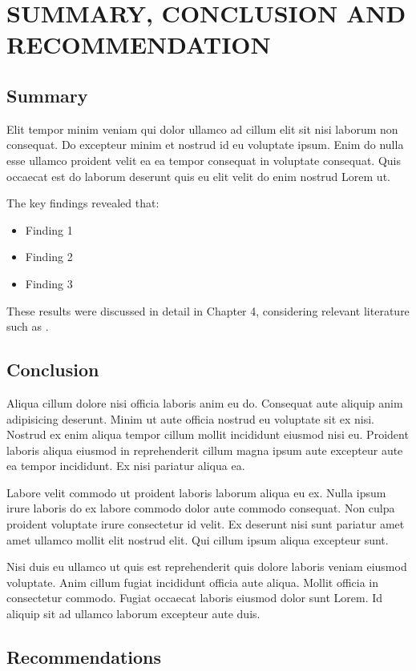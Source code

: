 \chapter{SUMMARY, CONCLUSION AND RECOMMENDATION}

\section{Summary}
Elit tempor minim veniam qui dolor ullamco ad cillum elit sit nisi laborum non consequat. Do excepteur minim et nostrud id eu voluptate ipsum. Enim do nulla esse ullamco proident velit ea ea tempor consequat in voluptate consequat. Quis occaecat est do laborum deserunt quis eu elit velit do enim nostrud Lorem ut.

The key findings revealed that:
\begin{itemize}
  \item Finding 1
  \item Finding 2
  \item Finding 3
\end{itemize}
These results were discussed in detail in Chapter 4, considering relevant literature such as \textcite{placeholderArticle2023}.

\section{Conclusion}
Aliqua cillum dolore nisi officia laboris anim eu do. Consequat aute aliquip anim adipisicing deserunt. Minim ut aute officia nostrud eu voluptate sit ex nisi. Nostrud ex enim aliqua tempor cillum mollit incididunt eiusmod nisi eu. Proident laboris aliqua eiusmod in reprehenderit cillum magna ipsum aute excepteur aute ea tempor incididunt. Ex nisi pariatur aliqua ea.

Labore velit commodo ut proident laboris laborum aliqua eu ex. Nulla ipsum irure laboris do ex labore commodo dolor aute commodo consequat. Non culpa proident voluptate irure consectetur id velit. Ex deserunt nisi sunt pariatur amet amet ullamco mollit elit nostrud elit. Qui cillum ipsum aliqua excepteur sunt.

Nisi duis eu ullamco ut quis est reprehenderit quis dolore laboris veniam eiusmod voluptate. Anim cillum fugiat incididunt officia aute aliqua. Mollit officia in consectetur commodo. Fugiat occaecat laboris eiusmod dolor sunt Lorem. Id aliquip sit ad ullamco laborum excepteur aute duis.

\section{Recommendations}

